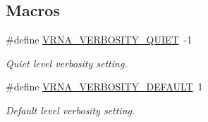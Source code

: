 \subsection*{Macros}
\begin{DoxyCompactItemize}
\item 
\mbox{\label{group__eval_gaf4afe19780b61b4962c613bde324128b}} 
\#define \mbox{\hyperlink{group__eval_gaf4afe19780b61b4962c613bde324128b}{V\+R\+N\+A\+\_\+\+V\+E\+R\+B\+O\+S\+I\+T\+Y\+\_\+\+Q\+U\+I\+ET}}~-\/1
\begin{DoxyCompactList}\small\item\em Quiet level verbosity setting. \end{DoxyCompactList}\item 
\mbox{\label{group__eval_ga47430d9e875084cfb983b22612e3abdf}} 
\#define \mbox{\hyperlink{group__eval_ga47430d9e875084cfb983b22612e3abdf}{V\+R\+N\+A\+\_\+\+V\+E\+R\+B\+O\+S\+I\+T\+Y\+\_\+\+D\+E\+F\+A\+U\+LT}}~1
\begin{DoxyCompactList}\small\item\em Default level verbosity setting. \end{DoxyCompactList}\end{DoxyCompactItemize}
